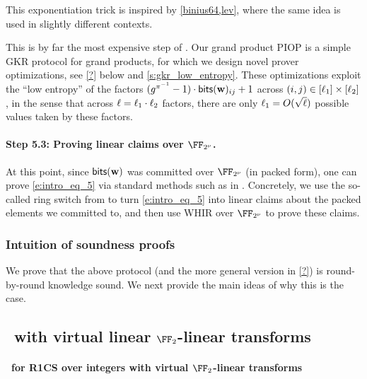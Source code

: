 \documentclass[11pt,letterpaper,usenames,dvipsnames]{article}
\begin{document}
        This exponentiation trick is inspired by  \cref{binius64,lev}, where the same idea is used in slightly different contexts. 



        This is by far the most expensive step of \ftwoz. Our grand product PIOP is a simple GKR protocol for grand products, for which we design novel  prover optimizations, see \cref{?} below and \cref{s:gkr_low_entropy}. These optimizations exploit the ``low entropy'' of the factors $(g^{\pi^{-1}}-1)\cdot \mathsf{bits}(\mathbf{w})_{ij} +1$ across $(i,j)\in [\ell_1]\times [\ell_2]$, in the sense that across $\ell=\ell_1\cdot \ell_2$ factors, there are only $\ell_1=O(\sqrt{\ell})$ possible values taken by these factors. 

  
 \paragraph{Step 5.3: Proving linear claims over $\comfield$.} At this point, since $\mathsf{bits}(\mathbf{w})$ was committed over $\comfield$ (in packed form), one can prove \eqref{e:intro_eq_5} via standard methods such as in \cite{binius,binius2,flock}. Concretely, we use the so-called ring switch from \cite{binius,binius2} to turn \eqref{e:intro_eq_5} into linear claims about the packed elements we committed to, and then use WHIR \cite{whir} over $\comfield$ to prove these claims. 

 \subsubsection{Intuition of soundness proofs}

 We prove that the above protocol (and the more general version in \cref{?}) is round-by-round knowledge sound. We next provide the main ideas of why this is the case.



\subsection{\ftwoz \ with virtual linear $\FF_2$-linear transforms}



\paragraph{\ftwoz \ for R1CS over integers with virtual $\FF_2$-linear transforms}\label{s:iop_forRELCM}
\end{document}
